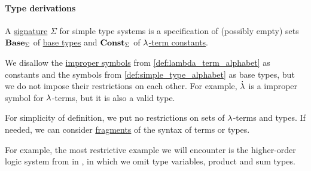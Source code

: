 \paragraph{Type derivations}

\begin{definition}\label{def:simple_type_signature}\mimprovised
  A \hyperref[con:logical_system_signature]{signature} \( \Sigma \) for simple type systems is a specification of (possibly empty) sets \( \op*{Base}_\Sigma \) of \hyperref[def:simple_type]{base types} and \( \op*{Const}_\Sigma \) of \hyperref[def:lambda_term]{\( {\mathrm \lambda} \)-term constants}.

  We disallow the \hyperref[con:improper_symbol]{improper symbols} from \cref{def:lambda_term_alphabet} as constants and the symbols from \cref{def:simple_type_alphabet} as base types, but we do not impose their restrictions on each other. For example, \( \mathord{\dot{{\mathrm \lambda}}} \) is a improper symbol for \( {\mathrm \lambda} \)-terms, but it is also a valid type.
\end{definition}
\begin{comments}
  \item For simplicity of definition, we put no restrictions on sets of \( {\mathrm \lambda} \)-terms and types. If needed, we can consider \hyperref[con:syntax_fragment]{fragments} of the syntax of terms or types.

  For example, the most restrictive example we will encounter is the higher-order logic system from in , in which we omit type variables, product and sum types.
\end{comments}

